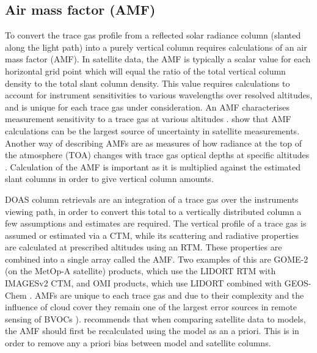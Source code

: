   \subsection{Air mass factor (AMF)}
  \label{Model:omhcho:amf}
    To convert the trace gas profile from a reflected solar radiance column (slanted along the light path) into a purely vertical column requires calculations of an air mass factor (AMF).
    In satellite data, the AMF is typically a scalar value for each horizontal grid point which will equal the ratio of the total vertical column density to the total slant column density.
    This value requires calculations to account for instrument sensitivities to various wavelengths over resolved altitudes, and is unique for each trace gas under consideration.
    An AMF characterises measurement sensitivity to a trace gas at various altitudes \cite[e.g.,]{Palmer2001}.
    \textcite{Lorente2017} show that AMF calculations can be the largest source of uncertainty in satellite measurements.
    Another way of describing AMFs are as measures of how radiance at the top of the atmosphere (TOA) changes with trace gas optical depths at specific altitudes \parencite{Lorente2017}.
    Calculation of the AMF is important as it is multiplied against the estimated slant columns in order to give vertical column amounts.
    
    DOAS column retrievals are an integration of a trace gas over the instruments viewing path, in order to convert this total to a vertically distributed column a few assumptions and estimates are required. 
    The vertical profile of a trace gas is assumed or estimated via a CTM, while its scattering and radiative properties are calculated at prescribed altitudes using an RTM. 
    These properties are combined into a single array called the AMF.
    Two examples of this are GOME-2 (on the MetOp-A satellite) products, %
    which use the LIDORT RTM with IMAGESv2 CTM, and OMI products, which use LIDORT combined with GEOS-Chem \parencite{Chance2002, Abad2015}.
    AMFs are unique to each trace gas and due to their complexity and the influence of cloud cover they remain one of the largest error sources in remote sensing of BVOCs \parencite{Palmer2001,Millet2006}).
    \textcite{Lamsal2014} recommends that when comparing satellite data to models, the AMF should first be recalculated using the model as an a priori.
    This is in order to remove any a priori bias between model and satellite columns.
    
